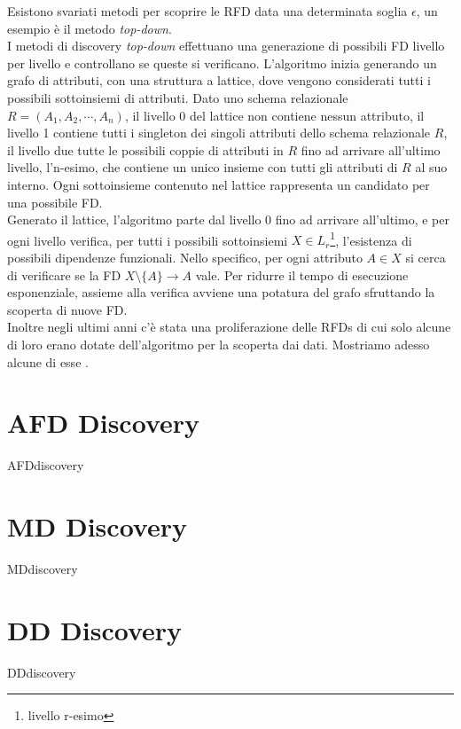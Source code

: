 Esistono svariati metodi per scoprire le RFD data una determinata soglia $\epsilon$, un esempio è il metodo \textit{top-down}.\\
I metodi di discovery \textit{top-down} effettuano una generazione di possibili FD livello per livello e controllano se queste si verificano. L'algoritmo inizia generando un grafo di attributi, con una struttura a lattice, dove vengono considerati tutti i possibili sottoinsiemi di attributi. Dato uno schema relazionale $R = (A_1, A_2, \cdots, A_n)$, il livello 0 del lattice non contiene nessun attributo, il livello 1 contiene tutti i singleton dei singoli attributi dello schema relazionale $R$, il livello due tutte le possibili coppie di attributi in $R$ fino ad arrivare all'ultimo livello, l'n-esimo, che contiene un unico insieme con tutti gli attributi di $R$ al suo interno. Ogni sottoinsieme contenuto nel lattice rappresenta un candidato per una possibile FD.\\
Generato il lattice, l'algoritmo parte dal livello 0 fino ad arrivare all'ultimo, e per ogni livello verifica, per tutti i possibili sottoinsiemi $X \in L_r$\footnote{livello r-esimo}, l'esistenza di possibili dipendenze funzionali. Nello specifico, per ogni attributo $A \in X$ si cerca di verificare se la FD $X \setminus \{A\} \rightarrow A$ vale. Per ridurre il tempo di esecuzione esponenziale, assieme alla verifica avviene una potatura del grafo sfruttando la scoperta di nuove FD.\\
Inoltre negli ultimi anni c'è stata una proliferazione delle RFDs di cui solo alcune di loro erano dotate dell'algoritmo per la scoperta dai dati. Mostriamo adesso alcune di esse \cite{onDiscovery}.


\section{AFD Discovery}
{AFDdiscovery}
\section{MD Discovery}
{MDdiscovery}
\section{DD Discovery}
{DDdiscovery}